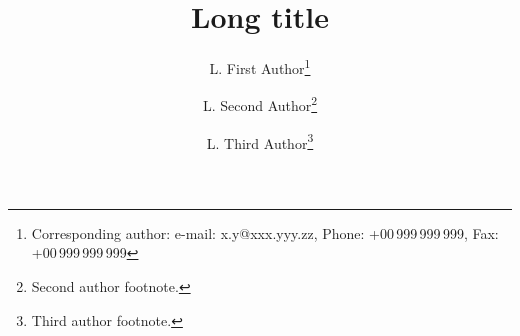 \documentclass[cpp,fleqn]{w-art}
\begin{document}



\title[Short Title]{Long title}


\author[Sh. First Author]{L. First Author\footnote{Corresponding
     author: e-mail: {\sf x.y@xxx.yyy.zz}, Phone: +00\,999\,999\,999,
     Fax: +00\,999\,999\,999}} \address[\inst{1}]{First address}
\author[Sh. Second Author]{L. Second Author\footnote{Second author footnote.}}
\address[\inst{2}]{Second address}
\author[Sh. Third Author]{L. Third Author\footnote{Third author footnote.}}
\begin{abstract}
\end{abstract}
\maketitle                   %
\end{document}

